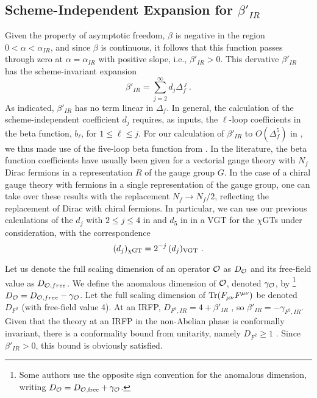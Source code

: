 \documentclass[prd,twocolumn,nofootinbib,amsfonts,amssymb]{revtex4}
\newcommand{\beq}{\begin{equation}}
\newcommand{\eeq}{\end{equation}}
\begin{document}

\subsection{Scheme-Independent Expansion for $\beta'_{IR}$ } 

Given the property of asymptotic freedom, $\beta$ is negative in the
region $0 < \alpha < \alpha_{IR}$, and since $\beta$ is continuous, it follows
that this function passes through zero at $\alpha=\alpha_{IR}$ 
with positive slope, i.e., $\beta'_{IR} > 0$. This dervative $\beta'_{IR}$ 
has the scheme-invariant expansion
%
\beq
\beta'_{IR} = \sum_{j=2}^\infty d_j\Delta_f^{\ j} \ . 
\label{betaprime_delta_series}
\eeq
%
As indicated, $\beta'_{IR}$ has no term linear in $\Delta_f$.  In general, the
calculation of the scheme-independent coefficient $d_j$ requires, as inputs,
the $\ell$-loop coefficients in the beta function, $b_\ell$, for $1 \le \ell
\le j$.  For our calculation of $\beta'_{IR}$ to $O(\Delta_f^5)$ in
\cite{dexl}, we thus made use of the five-loop beta function from \cite{b5}.
In the literature, the beta function coefficients have usually been given for a
vectorial gauge theory with $N_f$ Dirac fermions in a representation $R$ of the
gauge group $G$. In the case of a chiral gauge theory with fermions in a single
representation of the gauge group, one can take over these results with the
replacement $N_f \to N_f/2$, reflecting the replacement of Dirac with chiral
fermions. In particular, we can use our previous calculations of the $d_j$ with
$2 \le j \le 4$ in \cite{dex} and $d_5$ in \cite{dexl} in a VGT for the
$\chi$GTs under consideration, with the correspondence
%
\beq
(d_j)_{\chi {\rm GT}} = 2^{-j} \, (d_j)_{\rm VGT} \ . 
\label{djrel_cgt_vgt}
\eeq
%

Let us denote the full scaling dimension of an operator ${\cal O}$ as $D_{\cal
  O}$ and its free-field value as $D_{{\cal O},free}$. We define the anomalous
dimension of ${\cal O}$, denoted $\gamma_{\cal O}$, by \footnote{
Some authors use the opposite sign convention for the anomalous dimension,
writing $D_{\cal O} = D_{\cal O,{\rm free}} + \gamma_{\cal O}$.} 
$D_{\cal O} = D_{{\cal O},free} - \gamma_{\cal O}$. Let the full scaling
dimension of ${\rm Tr}(F_{\mu\nu}F^{\mu\nu})$ be denoted $D_{F^2}$ (with
free-field value 4). At an IRFP, $D_{F^2,IR} = 4 + \beta'_{IR}$
\cite{traceanomaly}, so $\beta'_{IR} = -\gamma_{F^2,IR}$. Given that the theory
at an IRFP in the non-Abelian phase is conformally invariant, there is a
conformality bound from unitarity, namely $D_{F^2} \ge 1$ \cite{gammabound}.
Since $\beta'_{IR} > 0$, this bound is obviously satisfied.
\end{document}
